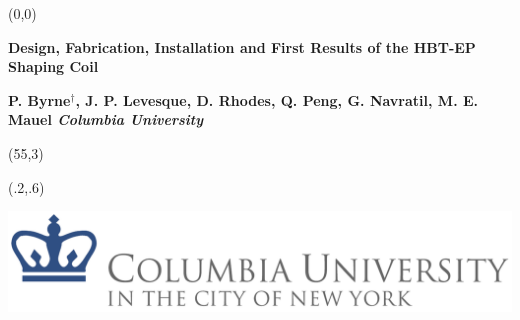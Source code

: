 \documentclass{article}
\begin{document}

%


%


\begin{textblock}{70}(0,0)


\begin{center}

\vspace{5mm}\def\myfig#1{\begin{center}\texttt{[image: \#1]}\end{center}}

{\veryHuge\color{black} \textbf{Design, Fabrication, Installation and First Results of the HBT-EP Shaping Coil}}

\vspace{15mm}
\rm
\sf
\LARGE\textbf{\color{lnavy}
P. Byrne$^\dagger$, J. P. Levesque, D. Rhodes, Q. Peng, G. Navratil, M. E. Mauel \hspace{2in} \emph{Columbia University}}\\

\vspace{5mm}

\end{center}
\end{textblock}
\begin{textblock}{12}(55,3)
\begin{flushright}

\hspace{.25in}

\end{flushright}
\end{textblock}

\begin{textblock}{3}(.2,.6)

\includegraphics[scale =.75]{CU_logo_exported.png}

\end{textblock}
\end{document}
